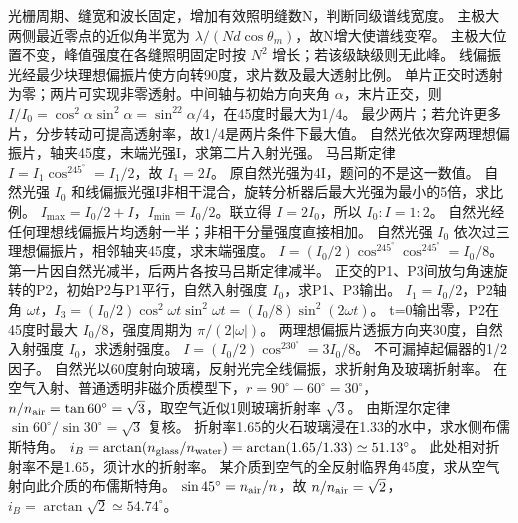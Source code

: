 \problemtext 光栅周期、缝宽和波长固定，增加有效照明缝数N，判断同级谱线宽度。
\workings 主极大两侧最近零点的近似角半宽为 $\lambda/(Nd\cos\theta_m)$，故N增大使谱线变窄。
\crosscheck 主极大位置不变，峰值强度在各缝照明固定时按 $N^2$ 增长；若该级缺级则无此峰。
\problemtext 线偏振光经最少块理想偏振片使方向转90度，求片数及最大透射比例。
\workings 单片正交时透射为零；两片可实现非零透射。中间轴与初始方向夹角 $\alpha$，末片正交，则 $I/I_0=\cos^2\alpha\sin^2\alpha=\sin^22\alpha/4$，在45度时最大为1/4。
\crosscheck 最少两片；若允许更多片，分步转动可提高透射率，故1/4是两片条件下最大值。
\problemtext 自然光依次穿两理想偏振片，轴夹45度，末端光强I，求第二片入射光强。
\workings 马吕斯定律 $I=I_1\cos^245^\circ=I_1/2$，故 $I_1=2I$。
\crosscheck 原自然光强为4I，题问的不是这一数值。
\problemtext 自然光强 $I_0$ 和线偏振光强I非相干混合，旋转分析器后最大光强为最小的5倍，求比例。
\workings $I_{\max}=I_0/2+I$，$I_{\min}=I_0/2$。联立得 $I=2I_0$，所以 $I_0:I=1:2$。
\crosscheck 自然光经任何理想线偏振片均透射一半；非相干分量强度直接相加。
\problemtext 自然光强 $I_0$ 依次过三理想偏振片，相邻轴夹45度，求末端强度。
\workings $I=(I_0/2)\cos^245^\circ\cos^245^\circ=I_0/8$。
\crosscheck 第一片因自然光减半，后两片各按马吕斯定律减半。
\problemtext 正交的P1、P3间放匀角速旋转的P2，初始P2与P1平行，自然入射强度 $I_0$，求P1、P3输出。
\workings $I_1=I_0/2$，P2轴角 $\omega t$，$I_3=(I_0/2)\cos^2\omega t\sin^2\omega t=(I_0/8)\sin^2(2\omega t)$。
\crosscheck t=0输出零，P2在45度时最大 $I_0/8$，强度周期为 $\pi/(2|\omega|)$。
\problemtext 两理想偏振片透振方向夹30度，自然入射强度 $I_0$，求透射强度。
\workings $I=(I_0/2)\cos^230^\circ=3I_0/8$。
\crosscheck 不可漏掉起偏器的1/2因子。
\problemtext 自然光以60度射向玻璃，反射光完全线偏振，求折射角及玻璃折射率。
\workings 在空气入射、普通透明非磁介质模型下，$r=90^\circ-60^\circ=30^\circ$，$n/n_{\rm air}=\tan60^\circ=\sqrt3$，取空气近似1则玻璃折射率 $\sqrt3$。
\crosscheck 由斯涅尔定律 $\sin60^\circ/\sin30^\circ=\sqrt3$ 复核。
\problemtext 折射率1.65的火石玻璃浸在1.33的水中，求水侧布儒斯特角。
\workings $i_B=\arctan(n_{\rm glass}/n_{\rm water})=\arctan(1.65/1.33)\simeq51.13^\circ$。
\crosscheck 此处相对折射率不是1.65，须计水的折射率。
\problemtext 某介质到空气的全反射临界角45度，求从空气射向此介质的布儒斯特角。
\workings $\sin45^\circ=n_{\rm air}/n$，故 $n/n_{\rm air}=\sqrt2$，$i_B=\arctan\sqrt2\simeq54.74^\circ$。
